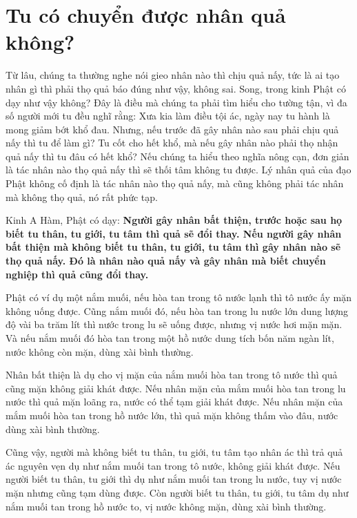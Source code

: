 \documentclass[
  12pt,
  oneside]{book}
\begin{document}
\hypertarget{tu-co-chuyen-duoc-nhan-qua-khong}{%
\chapter*{Tu có chuyển được nhân quả không?}\label{tu-co-chuyen-duoc-nhan-qua-khong}}

Từ lâu, chúng ta thường nghe nói gieo nhân nào thì chịu quả nấy, tức là ai tạo nhân gì thì phải thọ quả báo đúng như vậy, không sai. Song, trong kinh Phật có dạy như vậy không? Đây là điều mà chúng ta phải tìm hiểu cho tường tận, vì đa số người mới tu đều nghĩ rằng: Xưa kia làm điều tội ác, ngày nay tu hành là mong giảm bớt khổ đau. Nhưng, nếu trước đã gây nhân nào sau phải chịu quả nấy thì tu để làm gì? Tu cốt cho hết khổ, mà nếu gây nhân nào phải thọ nhận quả nấy thì tu đâu có hết khổ? Nếu chúng ta hiểu theo nghĩa nông cạn, đơn giản là tác nhân nào thọ quả nấy thì sẽ thối tâm không tu được. Lý nhân quả của đạo Phật không cố định là tác nhân nào thọ quả nấy, mà cũng không phải tác nhân mà không thọ quả, nó rất phức tạp.

Kinh A Hàm, Phật có dạy: \textbf{Người gây nhân bất thiện, trước hoặc sau họ biết tu thân, tu giới, tu tâm thì quả sẽ đổi thay. Nếu người gây nhân bất thiện mà không biết tu thân, tu giới, tu tâm thì gây nhân nào sẽ thọ quả nấy. Đó là nhân nào quả nấy và gây nhân mà biết chuyển nghiệp thì quả cũng đổi thay.}

Phật có ví dụ một nắm muối, nếu hòa tan trong tô nước lạnh thì tô nước ấy mặn không uống được. Cũng nắm muối đó, nếu hòa tan trong lu nước lớn dung lượng độ vài ba trăm lít thì nước trong lu sẽ uống được, nhưng vị nước hơi mặn mặn. Và nếu nắm muối đó hòa tan trong một hồ nước dung tích bốn năm ngàn lít, nước không còn mặn, dùng xài bình thường.

Nhân bất thiện là dụ cho vị mặn của nắm muối hòa tan trong tô nước thì quả cũng mặn không giải khát được. Nếu nhân mặn của mắm muối hòa tan trong lu nước thì quả mặn loãng ra, nước có thể tạm giải khát được. Nếu nhân mặn của mắm muối hòa tan trong hồ nước lớn, thì quả mặn không thấm vào đâu, nước dùng xài bình thường.

Cũng vậy, người mà không biết tu thân, tu giới, tu tâm tạo nhân ác thì trả quả ác nguyên vẹn dụ như nắm muối tan trong tô nước, không giải khát được. Nếu người biết tu thân, tu giới thì dụ như nắm muối tan trong lu nước, tuy vị nước mặn nhưng cũng tạm dùng được. Còn người biết tu thân, tu giới, tu tâm dụ như nắm muối tan trong hồ nước to, vị nước không mặn, dùng xài bình thường.
\end{document}
